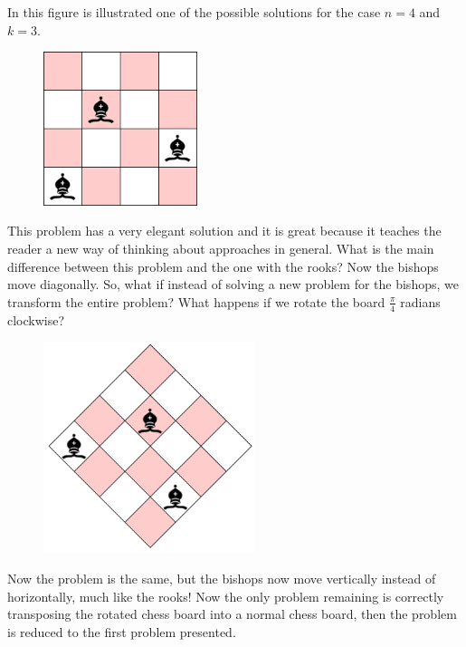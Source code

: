 \documentclass[letterpaper]{article}
\begin{document}
In this figure is illustrated one of the possible solutions for the case $n = 4$ and $k = 3$.

\begin{figure} [h!]
\centering
\includegraphics[width=0.40\textwidth]{pngOfDiagrams/dpchessbishop1.png}
\end{figure}

This problem has a very elegant solution and it is great because it teaches the reader a new way of thinking about approaches in general. What is the main difference between this problem and the one with the rooks? Now the bishops move diagonally. So, what if instead of solving a new problem for the bishops, we transform the entire problem? What happens if we rotate the board $\frac{\pi}{4}$ radians clockwise?

\newpage

\begin{figure} [h!]
\centering
\includegraphics[width=0.55\textwidth]{pngOfDiagrams/bihsop3.png}
\end{figure}

Now the problem is the same, but the bishops now move vertically instead of horizontally, much like the rooks! Now the only problem remaining is correctly transposing the rotated chess board into a normal chess board, then the problem is reduced to the first problem presented.
\end{document}
